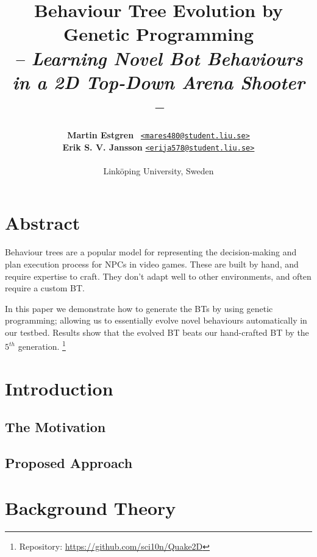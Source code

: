 \documentclass[a4paper, twocolumn]{article}
\title{\textbf{Behaviour Tree Evolution by Genetic Programming}\\
       \Large{\emph{-- Learning Novel Bot Behaviours in a 2D Top-Down Arena Shooter --}}}
\author{{\textbf{Martin Estgren}} \;\;\;\;\;\;\;\;\;\, {\href{mailto:mares480@student.liu.se}
                                                       {\texttt{<mares480@student.liu.se>}}} \\
        {\textbf{Erik S. V. Jansson}} \;\;\;\;         {\href{mailto:erija578@student.liu.se}
                                                       {\texttt{<erija578@student.liu.se>}}} \\~\\
        {Linköping University, Sweden}\vspace{-2.0ex}}
\begin{document}
    \maketitle
    \section*{Abstract}

    Behaviour trees are a popular model for representing the decision-making and plan execution process for NPCs in video games. These are built by hand, and require expertise to craft. They don't adapt well to other environments, and often require a custom BT.

    In this paper we demonstrate how to generate the BTs by using genetic programming; allowing us to essentially evolve novel behaviours automatically in our testbed. Results show that the evolved BT beats our hand-crafted BT by the \(5^{th}\) generation. \footnote{Repository: \url{https://github.com/sci10n/Quake2D}}

    \vspace{1.8em}

    \begingroup
    \def\addvspace#1{}
    \tableofcontents
    \endgroup
    \newpage

    \newpage %
    \nocite{*} %
    
    
    \clearpage

    \section{Introduction} \label{sec:introduction}



        \subsection{The Motivation} \label{sec:the_motivation}



        \subsection{Proposed Approach} \label{sec:proposed_approach}



    \section{Background Theory} \label{sec:background_theory}
\end{document}

